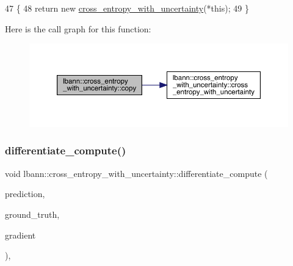 \begin{DoxyCode}
47                                                         \{
48     \textcolor{keywordflow}{return} \textcolor{keyword}{new} \hyperlink{classlbann_1_1cross__entropy__with__uncertainty_a93f0ab9861859a3b54fc5c723a27aaaa}{cross\_entropy\_with\_uncertainty}(*\textcolor{keyword}{this});
49   \}
\end{DoxyCode}
Here is the call graph for this function\+:\nopagebreak
\begin{figure}[H]
\begin{center}
\leavevmode
\includegraphics[width=350pt]{classlbann_1_1cross__entropy__with__uncertainty_a3df6ab2f0b06922f860096636242b1bd_cgraph}
\end{center}
\end{figure}
\mbox{\label{classlbann_1_1cross__entropy__with__uncertainty_a48ebe2b7a2193c124df0cd15813835d0}} 
\subsubsection{\texorpdfstring{differentiate\+\_\+compute()}{differentiate\_compute()}}
{\footnotesize\ttfamily void lbann\+::cross\+\_\+entropy\+\_\+with\+\_\+uncertainty\+::differentiate\+\_\+compute (\begin{DoxyParamCaption}\item[{const \hyperlink{base_8hpp_a9a697a504ae84010e7439ffec862b470}{Abs\+Dist\+Mat} \&}]{prediction,  }\item[{const \hyperlink{base_8hpp_a9a697a504ae84010e7439ffec862b470}{Abs\+Dist\+Mat} \&}]{ground\+\_\+truth,  }\item[{\hyperlink{base_8hpp_a9a697a504ae84010e7439ffec862b470}{Abs\+Dist\+Mat} \&}]{gradient }\end{DoxyParamCaption})\hspace{0.3cm}{\ttfamily [override]}, {\ttfamily [virtual]}}

